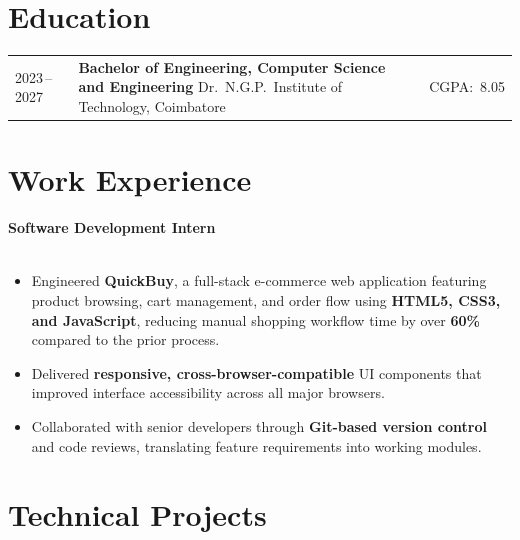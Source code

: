 \documentclass[a4paper,11pt]{article}
\begin{document}
\section{Education}
{\small
\begin{tabularx}{\linewidth}{@{} l X r @{}}
  2023\,--\,2027 &
  \textbf{Bachelor of Engineering, Computer Science and Engineering} \newline
  Dr.\ N.G.P.\ Institute of Technology, Coimbatore
  & CGPA:\ 8.05 \\
\end{tabularx}
}

\section{Work Experience}
{\small
\noindent\textbf{Software Development Intern}\\[-2pt]
\\[-4pt]
\begin{itemize}[nosep, leftmargin=1em, itemsep=1pt]
  \item Engineered \textbf{QuickBuy}, a full-stack e-commerce web application featuring
        product browsing, cart management, and order flow using
        \textbf{HTML5, CSS3, and JavaScript}, reducing manual shopping workflow time
        by over \textbf{60\%} compared to the prior process.
  \item Delivered \textbf{responsive, cross-browser-compatible} UI components that improved
        interface accessibility across all major browsers.
  \item Collaborated with senior developers through \textbf{Git-based version control} and
        code reviews, translating feature requirements into working modules.
\end{itemize}
}

\section{Technical Projects}
\end{document}
